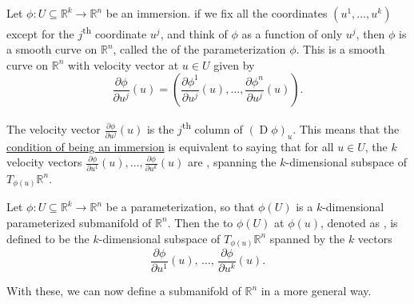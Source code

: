 \documentclass[notoc,notitlepage]{tufte-book}
\DeclareMathOperator{\D}{D}
\begin{document}
\begin{defn}\label{defn:_j_th_coordinate_curve}
  Let $\phi : U \subseteq \mathbb{R}^k \to \mathbb{R}^n$ be an immersion. if we
  fix all the coordinates $(u^1, \ldots, u^k)$ except for the
  $j$\textsuperscript{th} coordinate $u^j$, and think of $\phi$ as a function of
  only $u^j$, then $\phi$ is a smooth curve on $\mathbb{R}^n$, called the
   of the parameterization
  $\phi$. This is a smooth curve on $\mathbb{R}^n$ with velocity vector at $u
  \in U$ given by
  \begin{equation*}
    \frac{\partial \phi}{\partial u^j} (u) = \left( \frac{\partial
      \phi^1}{\partial u^j} (u) , \ldots, \frac{\partial \phi^n}{\partial u^j}
      (u) \right).
  \end{equation*}
\end{defn}

\begin{note}
  The velocity vector $\frac{\partial \phi}{\partial u^j} (u)$ is the
  $j$\textsuperscript{th} column of $(\D \phi)_u$. This means that the
  \hyperref[defn:immersion]{condition of being an immersion} is equivalent to
  saying that for all $u \in U$, the $k$ velocity vectors $\frac{\partial
  \phi}{\partial u^1} (u), \ldots, \frac{\partial \phi}{\partial u^k} (u)$ are
  , spanning the $k$-dimensional subspace of
  $T_{\phi(u)} \mathbb{R}^n$.
\end{note}

\begin{defn}\label{defn:tangent_space_on_a_submanifold}
  Let $\phi : U \subseteq \mathbb{R}^k \to \mathbb{R}^n$ be a parameterization,
  so that $\phi(U)$ is a $k$-dimensional parameterized submanifold of
  $\mathbb{R}^n$. Then the  to $\phi(U)$ at $\phi(u)$,
  denoted as , is defined to be the
  $k$-dimensional subspace of $T_{\phi(u)} \mathbb{R}^n$ spanned by the $k$
  vectors
  \begin{equation*}
    \frac{\partial \phi}{\partial u^1} (u), \, \ldots, \, \frac{\partial
    \phi}{\partial u^k} (u).
  \end{equation*}
\end{defn}

With these, we can now define a submanifold of $\mathbb{R}^n$ in a more general
way.
\end{document}
